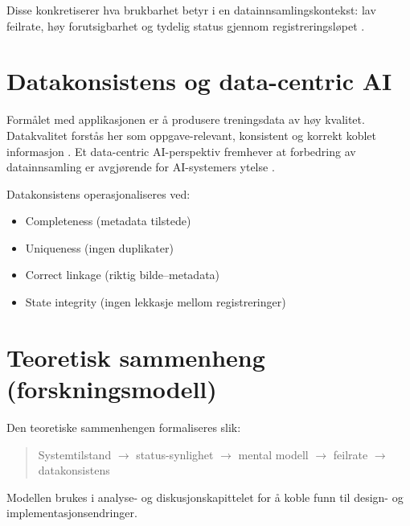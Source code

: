 Disse konkretiserer hva brukbarhet betyr i en datainnsamlingskontekst: lav feilrate, høy forutsigbarhet og tydelig status gjennom registreringsløpet \cite{nielsen1994}.

\section{Datakonsistens og data-centric AI}

Formålet med applikasjonen er å produsere treningsdata av høy kvalitet. Datakvalitet forstås her som oppgave-relevant, konsistent og korrekt koblet informasjon \cite{wang1996}. Et data-centric AI-perspektiv fremhever at forbedring av datainnsamling er avgjørende for AI-systemers ytelse \cite{jakubik2024}.

Datakonsistens operasjonaliseres ved:

\begin{itemize}
\item Completeness (metadata tilstede)
\item Uniqueness (ingen duplikater)
\item Correct linkage (riktig bilde–metadata)
\item State integrity (ingen lekkasje mellom registreringer)
\end{itemize}

\section{Teoretisk sammenheng (forskningsmodell)}

Den teoretiske sammenhengen formaliseres slik:

\begin{quote}
Systemtilstand $\rightarrow$ status-synlighet $\rightarrow$ mental modell $\rightarrow$ feilrate $\rightarrow$ datakonsistens
\end{quote}

Modellen brukes i analyse- og diskusjonskapittelet for å koble funn til design- og implementasjonsendringer.